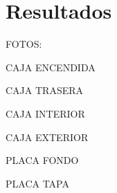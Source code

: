 \chapter{Resultados}\label{chp-07}

FOTOS:

CAJA ENCENDIDA

CAJA TRASERA

CAJA INTERIOR

CAJA EXTERIOR

PLACA FONDO

PLACA TAPA
